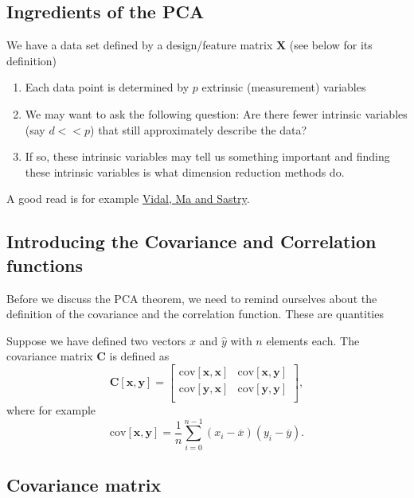 \documentclass[%
oneside,                 %
final,                   %
10pt]{article}
\begin{document}
\subsection{Ingredients of the PCA}

We have a data set defined by a design/feature matrix $\bm{X}$ (see below for its definition) 
\begin{enumerate}
\item Each data point is determined by $p$ extrinsic (measurement) variables

\item We may want to ask the following question: Are there fewer intrinsic variables (say $d << p$) that still approximately describe the data?

\item If so, these intrinsic variables may tell us something important and finding these intrinsic variables is what dimension reduction methods do. 
\end{enumerate}

\noindent
A good read is for example \href{{https://www.springer.com/gp/book/9780387878102}}{Vidal, Ma and Sastry}.

\subsection{Introducing the Covariance and Correlation functions}

Before we discuss the PCA theorem, we need to remind ourselves about
the definition of the covariance and the correlation function. These are quantities 

Suppose we have defined two vectors
$\hat{x}$ and $\hat{y}$ with $n$ elements each. The covariance matrix $\bm{C}$ is defined as 
\[
\bm{C}[\bm{x},\bm{y}] = \begin{bmatrix} \mathrm{cov}[\bm{x},\bm{x}] & \mathrm{cov}[\bm{x},\bm{y}] \\
                              \mathrm{cov}[\bm{y},\bm{x}] & \mathrm{cov}[\bm{y},\bm{y}] \\
             \end{bmatrix},
\]
where for example
\[
\mathrm{cov}[\bm{x},\bm{y}] =\frac{1}{n} \sum_{i=0}^{n-1}(x_i- \overline{x})(y_i- \overline{y}).
\]

\subsection{Covariance matrix}
\end{document}
